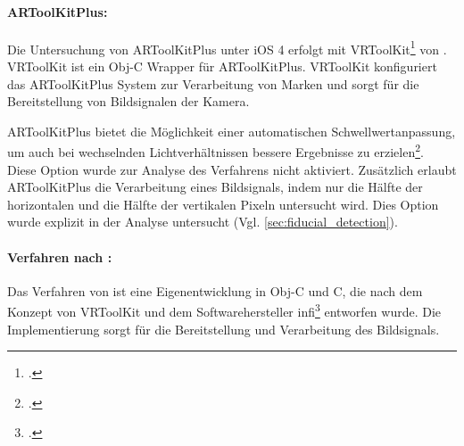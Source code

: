 \paragraph{ARToolKitPlus:} %
\label{par:artoolkitplus}
Die Untersuchung von ARToolKitPlus unter iOS 4 erfolgt mit VRToolKit\footcite[Vgl.][]{vrtoolkit} von
 \citeauthor{vrtoolkit}. VRToolKit ist ein Obj-C Wrapper für ARToolKitPlus. VRToolKit konfiguriert das ARToolKitPlus
 System zur Verarbeitung von Marken und sorgt für die Bereitstellung von Bildsignalen der Kamera.

ARToolKitPlus bietet die Möglichkeit einer automatischen Schwellwertanpassung, um auch bei wechselnden
 Lichtverhältnissen bessere Ergebnisse zu erzielen\footcite[Vgl.][S.~142]{wagner07b}. Diese Option wurde zur Analyse
 des Verfahrens nicht aktiviert. Zusätzlich erlaubt ARToolKitPlus die Verarbeitung eines Bildsignals, indem nur die
 Hälfte der horizontalen und die Hälfte der vertikalen Pixeln untersucht wird. Dies Option wurde explizit in der
 Analyse untersucht (Vgl. \autoref{sec:fiducial_detection}).

\paragraph{Verfahren nach \citeauthor{hirzer08}:} %
\label{par:verfahren_nach_hirzer}
Das Verfahren von \citeauthor{hirzer08} ist eine Eigenentwicklung in Obj-C und C, die nach dem Konzept von VRToolKit und
 dem Softwarehersteller infi\footcite[Vgl.][]{infi} entworfen wurde. Die Implementierung sorgt für die Bereitstellung
 und Verarbeitung des Bildsignals.

